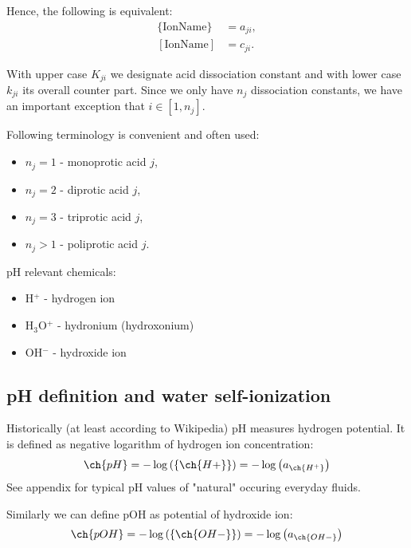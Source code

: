 Hence, the following is equivalent:
\begin{align}
    \{\text{IonName}\} & = a_{ji}, \\
    [\text{IonName}]   & = c_{ji}.
\end{align}

With upper case $K_{ji}$ we designate acid dissociation constant and with lower case $k_{ji}$ its
overall counter part. Since we only have $n_j$ dissociation constants, we have an important exception
that $i \in [1, n_j]$.

Following terminology is convenient and often used:
\begin{itemize}
    \item $n_j=1$ - monoprotic acid $j$,
    \item $n_j=2$ - diprotic acid $j$,
    \item $n_j=3$ - triprotic acid $j$,
    \item $n_j>1$ - poliprotic acid $j$.
\end{itemize}

pH relevant chemicals:
\begin{itemize}
    \item H$^{+}$ - hydrogen ion
    \item H$_3$O$^{+}$ - hydronium (hydroxonium)
    \item OH$^{-}$ - hydroxide ion
\end{itemize}



\subsection{pH definition and water self-ionization}

\noindent
Historically (at least according to Wikipedia) pH measures hydrogen potential. It is defined as negative logarithm of hydrogen ion concentration:
\begin{equation}\label{eq:phDef}
    \ch{pH} = -\log \left(\left\{\ch{H+}\right\}\right) = -\log\left(a_{\ch{H^+}}\right)
\end{equation}
See appendix for typical pH values of "natural" occuring everyday fluids.

\noindent
Similarly we can define pOH as potential of hydroxide ion:
\begin{equation}\label{eq:pohDef}
    \ch{pOH} = -\log \left(\left\{\ch{OH-}\right\}\right) = -\log\left(a_{\ch{OH-}}\right)
\end{equation}

